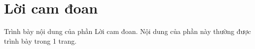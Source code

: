 \chapter*{Lời cam đoan}

Trình bày nội dung của phần Lời cam đoan. Nội dung của phần này thường được trình bày trong 1 trang.
